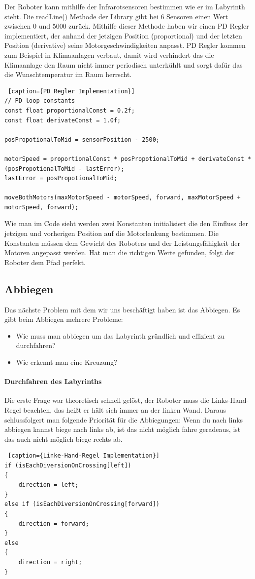 \documentclass[12pt]{article}
\begin{document}
Der Roboter kann mithilfe der Infrarotsensoren bestimmen wie er im Labyrinth steht. Die readLine() Methode der Library gibt bei 6 Sensoren einen Wert zwischen 0 und 5000 zurück. Mithilfe dieser Methode haben wir einen PD  Regler implementiert, der anhand der jetzigen Position (proportional) und der letzten Position (derivative) seine Motorgeschwindigkeiten anpasst. PD Regler kommen zum Beispiel in Klimaanlagen verbaut, damit wird verhindert das die Klimaanlage den Raum nicht immer periodisch unterkühlt und sorgt dafür das die Wunschtemperatur im Raum herrscht.
\begin{lstlisting} [caption={PD Regler Implementation}] 
// PD loop constants
const float proportionalConst = 0.2f;
const float derivateConst = 1.0f;

posPropotionalToMid = sensorPosition - 2500;

motorSpeed = proportionalConst * posPropotionalToMid + derivateConst * (posPropotionalToMid - lastError);
lastError = posPropotionalToMid;

moveBothMotors(maxMotorSpeed - motorSpeed, forward, maxMotorSpeed + motorSpeed, forward);
\end{lstlisting}
Wie man im Code sieht werden zwei Konstanten initialisiert die den Einfluss der jetzigen und vorherigen Position auf die Motorlenkung bestimmen. Die Konstanten müssen dem Gewicht des Roboters und der Leistungsfähigkeit der Motoren angepasst werden. Hat man  die richtigen Werte gefunden, folgt der Roboter dem Pfad perfekt.

\subsection{Abbiegen} Das nächste Problem mit dem wir uns beschäftigt haben ist das Abbiegen. Es gibt beim Abbiegen mehrere Probleme:
\begin{itemize}
\item Wie muss man abbiegen um das Labyrinth gründlich und effizient zu durchfahren?
\item Wie erkennt man eine Kreuzung?
\end{itemize}
\paragraph{Durchfahren des Labyrinths} Die erste Frage war theoretisch schnell gelöst, der Roboter muss die Links-Hand-Regel beachten, das heißt  er hält sich immer an der linken Wand. Daraus schlussfolgert man folgende Priorität für die Abbiegungen: Wenn du nach links abbiegen kannst biege nach links ab, ist das nicht möglich fahre geradeaus, ist das auch nicht möglich biege rechts ab.
\begin{lstlisting} [caption={Linke-Hand-Regel Implementation}]
if (isEachDiversionOnCrossing[left])
{
    direction = left;
}
else if (isEachDiversionOnCrossing[forward])
{
    direction = forward;
}
else
{
    direction = right;
}
\end{lstlisting}
\end{document}
